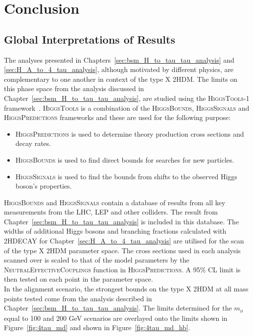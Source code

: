 \chapter{Conclusion}
\label{sec:conclusion}

\section{Global Interpretations of Results}

The analyses presented in Chapters~\ref{sec:bsm_H_to_tau_tau_analysis} and \ref{sec:H_A_to_4_tau_analysis}, although motivated by different physics, are complementary to one another in context of the type X \ac{2HDM}.
The limits on this phase space from the analysis discussed in Chapter~\ref{sec:bsm_H_to_tau_tau_analysis}, are studied using the \textsc{HiggsTools-1} framework~\cite{Bahl:2022igd}.
\textsc{HiggsTools} is a combination of the \textsc{HiggsBounds}, \textsc{HiggsSignals} and \textsc{HiggsPredictions} frameworks and these are used for the following purpose:

\begin{itemize}
\item \textsc{HiggsPredictions} is used to determine theory production cross sections and decay rates.
\item \textsc{HiggsBounds} is used to find direct bounds for searches for new particles.
\item \textsc{HiggsSignals} is used to find the bounds from shifts to the observed Higgs boson's properties.
\end{itemize}

\textsc{HiggsBounds} and \textsc{HiggsSignals} contain a database of results from all key measurements from the LHC, LEP and other colliders.
The result from Chapter~\ref{sec:bsm_H_to_tau_tau_analysis} is included in this database.
The widths of additional Higgs bosons and branching fractions calculated with \textsc{2HDECAY} for Chapter~\ref{sec:H_A_to_4_tau_analysis} are utilised for the scan of the type X 2HDM parameter space.
The cross sections used in each analysis scanned over is scaled to that of the model parameters by the \textsc{NeutralEffectiveCouplings} function in \textsc{HiggsPredictions}.
A 95\% CL limit is then tested on each point in the parameter space. \\

In the alignment scenario, the strongest bounds on the type X \ac{2HDM} at all mass points tested come from the analysis described in Chapter~\ref{sec:bsm_H_to_tau_tau_analysis}.
The limits determined for the $m_{\phi}$ equal to 100 and 200 GeV scenarios are overlayed onto the limits shown in Figure~\ref{fig:4tau_md} and shown in Figure~\ref{fig:4tau_md_hb}. \\

